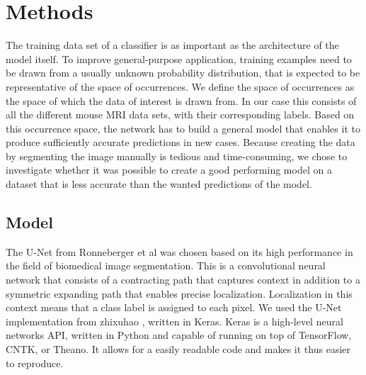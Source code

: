 \documentclass{article}
\begin{document}
\section{Methods}
The training data set of a classifier is as important as the architecture of the model itself.
To improve general-purpose application, training examples need to be drawn from a usually unknown probability distribution, that is expected to be representative of the space of occurrences.
We define the space of occurrences as the space of which the data of interest is drawn from.
In our case this consists of all the different mouse MRI data sets, with their corresponding labels.
Based on this occurrence space, the network has to build a general model that enables it to produce sufficiently accurate predictions in new cases.
Because creating the data by segmenting the image manually is tedious and time-consuming, we chose to investigate whether it was possible to create a good performing model on a dataset that is less accurate than the wanted predictions of the model.

\subsection{Model}
The U-Net from Ronneberger et al \cite{ronneberger_u-net:_2015} was chosen based on its high performance in the field of biomedical image segmentation.
This is a convolutional neural network that consists of a contracting path that captures context in addition to a symmetric expanding path that enables precise localization.
Localization in this context means that a class label is assigned to each pixel.
We used the U-Net implementation from zhixuhao \cite{zhixuhao_zhixuhao/unet_2020}, written in Keras.
Keras is a high-level neural networks API, written in Python and capable of running on top of TensorFlow, CNTK, or Theano.
It allows for a easily readable code and makes it thus easier to reproduce.
\end{document}
